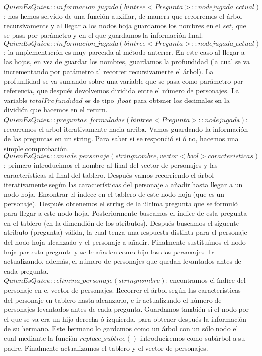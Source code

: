 \documentclass[paper=a4, fontsize=11pt]{scrartcl} %
\numberwithin{equation}{section} %
\numberwithin{figure}{section} %
\numberwithin{table}{section} %
\begin{document}
$QuienEsQuien::informacion\_jugada(bintree<Pregunta>::node jugada\_actual)$: nos hemos servido de una función auxiliar, de manera que recorremos el árbol recursivamente y al llegar a los nodos hoja guardamos los nombres en el $set$, que se pasa por parámetro y en el que guardamos la información final.\\

$QuienEsQuien::informacion\_jugada(bintree<Pregunta>::node jugada\_actual)$: la implementación es muy parecida al método anterior. En este caso al llegar a las hojas, en vez de guardar los nombres, guardamos la profundidad (la cual se va incrementando por parámetro al recorrer recursivamente el árbol). La profundidad se va sumando sobre una variable que se pasa como parámetro por referencia, que después devolvemos dividida entre el número de personajes. La variable $totalProfundidad$ es de tipo $float$ para obtener los decimales en la dividión que hacemos en el return.\\

$QuienEsQuien::preguntas\_formuladas(bintree<Pregunta>::node jugada)$: recorremos el árbol iterativamente hacia arriba. Vamos guardando la información de las preguntas en un string. Para saber si se respondió si ó no, hacemos una simple comprobación.\\

$QuienEsQuien::aniade\_personaje(string nombre, vector<bool> caracteristicas)$: primero introducimos el nombre al final del vector de personajes y las características al final del tablero. Después vamos recorriendo el árbol iterativamente según las características del personaje a añadir hasta llegar a un nodo hoja. Encontrar el índece en el tablero de este nodo hoja (que es un personaje). Después obtenemos el string de la última pregunta que se formuló para llegar a este nodo hoja. Posteriormente buscamos el índice de esta pregunta en el tablero (en la dimendión de los atributos). Después buscamos el siguente atributo (pregunta) válida, la cual tenga una respuesta distinta para el personaje del nodo hoja alcanzado y el personaje a añadir. Finalmente sustituímos el nodo hoja por esta pregunta y se le añaden como hijo los dos personajes. Ir actualizando, además, el número de personajes que quedan levantados antes de cada pregunta.\\

$QuienEsQuien::elimina\_personaje(string nombre)$: encontramos el índice del personaje en el vector de personajes. Recorrer el árbol según las características del personaje en tablero hasta alcanzarlo, e ir actualizando el número de personajes levantados antes de cada pregunta. Guardamos también si el nodo por el que se va era un hijo derecha ó izquierda, para obtener después la información de su hermano. Este hermano lo gardamos como un árbol con un sólo nodo el cual mediante la función $replace\_subtree()$ introduciremos como subárbol a su padre. Finalmente actualizamos el tablero y el vector de personajes.




\end{document}
